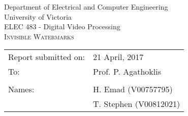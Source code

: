 \begin{titlepage}
  
  \begin{center}
    \begin{LARGE}
      Department of Electrical and Computer Engineering \\
      University of Victoria \\
      ELEC 483 - Digital Video Processing \\[1cm]
      \textsc{Invisible Watermarks}
      \\[1in]
    \end{LARGE}
  \end{center}
  
  \begin{tabular}{ p{} p{} } 
    Report submitted on:& 21 April, 2017 \\ 
    To: & Prof. P. Agathoklis \\ 
    & \\
    Names: & H. Emad (V00757795)\\
    & T. Stephen (V00812021)  \\[1in]
  \end{tabular}

\end{titlepage}

